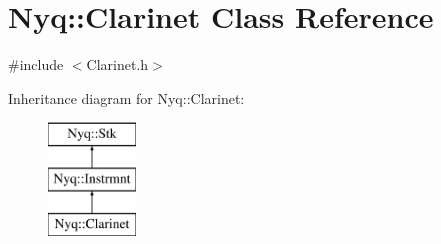 \hypertarget{class_nyq_1_1_clarinet}{}\section{Nyq\+:\+:Clarinet Class Reference}
\label{class_nyq_1_1_clarinet}


{\ttfamily \#include $<$Clarinet.\+h$>$}

Inheritance diagram for Nyq\+:\+:Clarinet\+:\begin{figure}[H]
\begin{center}
\leavevmode
\includegraphics[height=3.000000cm]{class_nyq_1_1_clarinet}
\end{center}
\end{figure}
